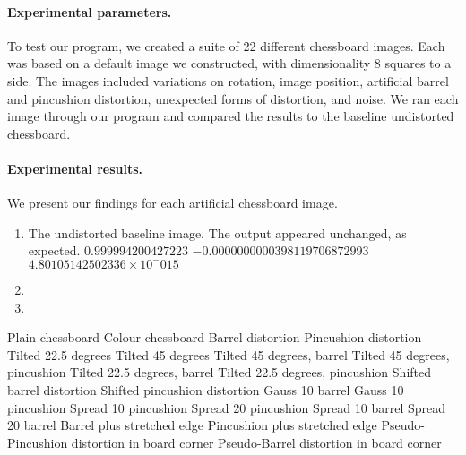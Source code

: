 \paragraph{Experimental parameters.}
To test our program, we created a suite of 22 different chessboard images. Each was based on a default image we constructed, with dimensionality 8 squares to a side. The images included variations on rotation, image position, artificial barrel and pincushion distortion, unexpected forms of distortion, and noise. We ran each image through our program and compared the results to the baseline undistorted chessboard.

\paragraph{Experimental results.}
We present our findings for each artificial chessboard image.
\begin{enumerate}
  \item The undistorted baseline image. The output appeared unchanged, as expected. 
$0.999994200427223$
$-0.0000000000398119706872993$
$4.80105142502336 \times 10^-015$

  \item 
  \item 
\end{enumerate}

Plain chessboard
Colour chessboard
Barrel distortion
Pincushion distortion
Tilted 22.5 degrees
Tilted 45 degrees
Tilted 45 degrees, barrel
Tilted 45 degrees, pincushion
Tilted 22.5 degrees, barrel
Tilted 22.5 degrees, pincushion
Shifted barrel distortion
Shifted pincushion distortion
Gauss 10 barrel
Gauss 10 pincushion
Spread 10 pincushion
Spread 20 pincushion
Spread 10 barrel
Spread 20 barrel
Barrel plus stretched edge
Pincushion plus stretched edge
Pseudo-Pincushion distortion in board corner
Pseudo-Barrel distortion in board corner


